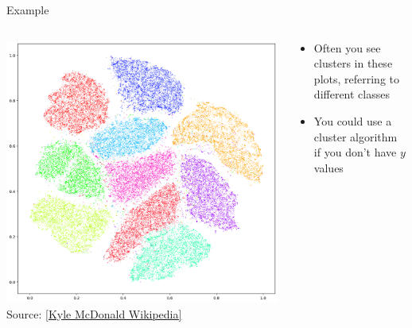 \documentclass[aspectratio=169]{../latex_main/tntbeamer}  %
\begin{document}
	
	\begin{frame}{Example}
	
	\begin{columns}
	
	\begin{column}{0.5\textwidth}
	
	  \centering
	 \includegraphics[width=.7\textwidth]{T-SNE_Embedding_of_MNIST.png}\\ 
	 \small Source: \href{https://commons.wikimedia.org/wiki/File:T-SNE_Embedding_of_MNIST.png}{[Kyle McDonald Wikipedia]}
	
	\end{column}
		
	\begin{column}{0.5\textwidth}

    \begin{itemize}
        \item Often you see clusters in these plots, referring to different classes
        \item You could use a cluster algorithm if you don't have $y$ values
    \end{itemize}	

	\end{column}
	
	\end{columns}
	    
	\end{frame}
	
\end{document}
